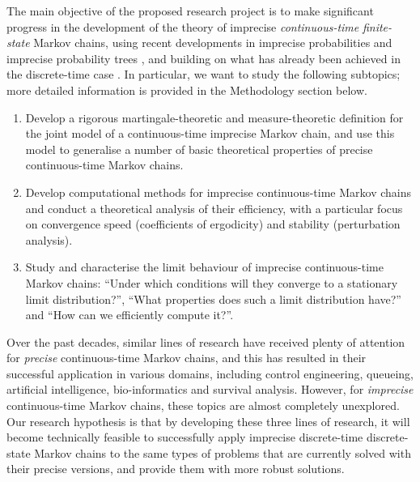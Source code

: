 \documentclass[11pt,dvipsnames,usenames,a4paper]{article}
\begin{document}
The main objective of the proposed research project is to make significant progress in the development of the theory of imprecise \emph{continuous-time} \emph{finite-state} Markov chains, using recent developments in imprecise probabilities \cite{augustin2013:itip,troffaes2013:lp} and imprecise probability trees \cite{shafer2001,cooman2007d}, and building on what has already been achieved in the discrete-time case \cite{cooman2008,hermans2012,skulj2013,cooman2015:markovergodic}. In particular, we want to study the following subtopics; more detailed information is provided in the Methodology section below.
\begin{enumerate}[label=\tiny$\blacksquare$,leftmargin=*,noitemsep]
\item Develop a rigorous martingale-theoretic and measure-theoretic definition for the joint model of a continuous-time imprecise Markov chain, and use this model to generalise a number of basic theoretical properties of precise continuous-time Markov chains.
\item Develop computational methods for imprecise continuous-time Markov chains and conduct a theoretical analysis of their efficiency, with a particular focus on convergence speed (coefficients of ergodicity) and stability (perturbation analysis).
\item Study and characterise the limit behaviour of imprecise continuous-time Markov chains: ``Under which conditions will they converge to a stationary limit distribution?'', ``What properties does such a limit distribution have?'' and ``How can we efficiently compute it?''.
\end{enumerate}
Over the past decades, similar lines of research have received plenty of attention for \emph{precise} continuous-time Markov chains, and this has resulted in their successful application in various domains, including control engineering, queueing, artificial intelligence, bio-informatics and survival analysis.
However, for \emph{imprecise} continuous-time Markov chains, these topics are almost completely unexplored.
Our research hypothesis is that by developing these three lines of research, it will become technically feasible to successfully apply imprecise discrete-time discrete-state Markov chains to the same types of problems that are currently solved with their precise versions, and provide them with more robust solutions.
\end{document}
